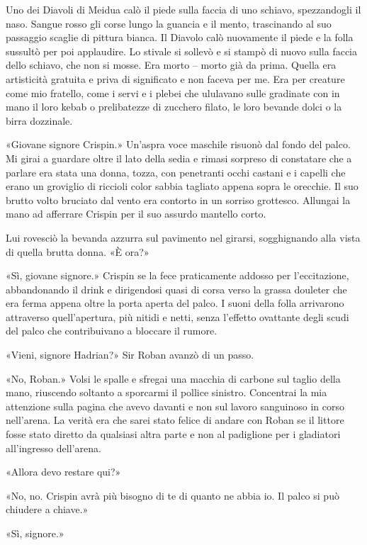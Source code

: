 Uno dei Diavoli di Meidua calò il piede sulla faccia di uno schiavo,
spezzandogli il naso. Sangue rosso gli corse lungo la guancia e il
mento, trascinando al suo passaggio scaglie di pittura bianca. Il
Diavolo calò nuovamente il piede e la folla sussultò per poi applaudire.
Lo stivale si sollevò e si stampò di nuovo sulla faccia dello schiavo,
che non si mosse. Era morto -- morto già da prima. Quella era
artisticità gratuita e priva di significato e non faceva per me. Era per
creature come mio fratello, come i servi e i plebei che ululavano sulle
gradinate con in mano il loro kebab o prelibatezze di zucchero filato,
le loro bevande dolci o la birra dozzinale.

«Giovane signore Crispin.» Un'aspra voce maschile risuonò dal fondo del
palco. Mi girai a guardare oltre il lato della sedia e rimasi sorpreso
di constatare che a parlare era stata una donna, tozza, con penetranti
occhi castani e i capelli che erano un groviglio di riccioli color
sabbia tagliato appena sopra le orecchie. Il suo brutto volto bruciato
dal vento era contorto in un sorriso grottesco. Allungai la mano ad
afferrare Crispin per il suo assurdo mantello corto.

Lui rovesciò la bevanda azzurra sul pavimento nel girarsi, sogghignando
alla vista di quella brutta donna. «È ora?»

«Sì, giovane signore.» Crispin se la fece praticamente addosso per
l'eccitazione, abbandonando il drink e dirigendosi quasi di corsa verso
la grassa douleter che era ferma appena oltre la porta aperta del palco.
I suoni della folla arrivarono attraverso quell'apertura, più nitidi e
netti, senza l'effetto ovattante degli scudi del palco che contribuivano
a bloccare il rumore.

«Vieni, signore Hadrian?» Sir Roban avanzò di un passo.

«No, Roban.» Volsi le spalle e sfregai una macchia di carbone sul taglio
della mano, riuscendo soltanto a sporcarmi il pollice sinistro.
Concentrai la mia attenzione sulla pagina che avevo davanti e non sul
lavoro sanguinoso in corso nell'arena. La verità era che sarei stato
felice di andare con Roban se il littore fosse stato diretto da
qualsiasi altra parte e non al padiglione per i gladiatori all'ingresso
dell'arena.

«Allora devo restare qui?»

«No, no. Crispin avrà più bisogno di te di quanto ne abbia io. Il palco
si può chiudere a chiave.»

«Sì, signore.»

